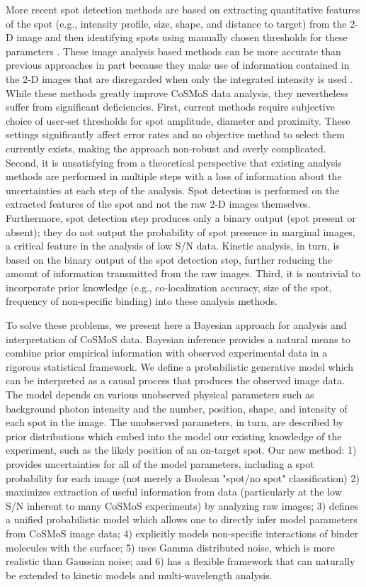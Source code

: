 More recent spot detection methods are based on extracting quantitative features of the spot (e.g., intensity profile, size, shape, and distance to target) from the 2-D image and then identifying spots using manually chosen thresholds for these parameters \citep{Friedman2015-nx, Smith2019-yb}. These image analysis based methods can be more accurate than previous approaches in part because they make use of information contained in the 2-D images that are disregarded when only the integrated intensity is used \citep{Friedman2015-nx}. While these methods greatly improve CoSMoS data analysis, they nevertheless suffer from significant deficiencies. First, current methods require subjective choice of user-set thresholds for spot amplitude, diameter and proximity. These settings significantly affect error rates and no objective method to select them currently exists, making the approach non-robust and overly complicated. Second, it is unsatisfying from a theoretical perspective that existing analysis methods are performed in multiple steps with a loss of information about the uncertainties at each step of the analysis. Spot detection is performed on the extracted features of the spot and not the raw 2-D images themselves. Furthermore, spot detection step produces only a binary output (spot present or absent); they do not output the probability of spot presence in marginal images, a critical feature in the analysis of low S/N data. Kinetic analysis, in turn, is based on the binary output of the spot detection step, further reducing the amount of information transmitted from the raw images. Third, it is nontrivial to incorporate prior knowledge (e.g., co-localization accuracy, size of the spot, frequency of non-specific binding) into these analysis methods.

To solve these problems, we present here a Bayesian approach for analysis and interpretation of CoSMoS data. Bayesian inference provides a natural means to combine prior empirical information with observed experimental data in a rigorous statistical framework. We define a probabilistic generative model which can be interpreted as a causal process that produces the observed image data. The model depends on various unobserved physical parameters such as background photon intensity and the number, position, shape, and intensity of each spot in the image. The unobserved parameters, in turn, are described by prior distributions which embed into the model our existing knowledge of the experiment, such as the likely position of an on-target spot. Our new method: 1) provides uncertainties for all of the model parameters, including a spot probability for each image (not merely a Boolean "spot/no spot" classification) 2) maximizes extraction of useful information from data (particularly at the low S/N inherent to many CoSMoS experiments) by analyzing raw images; 3) defines a unified probabilistic model which allows one to directly infer model parameters from CoSMoS image data; 4) explicitly models non-specific interactions of binder molecules with the surface; 5) uses Gamma distributed noise, which is more realistic than Gaussian noise; and 6) has a flexible framework that can naturally be extended to kinetic models and multi-wavelength analysis. 

